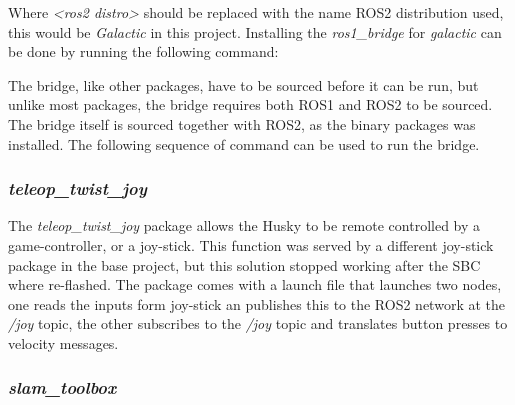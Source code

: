 \begin{tcolorbox}[width=\textwidth,colback={black},colupper=white, title={ubuntu terminal},colbacktitle=gray!125,coltitle=gray!50]\label{shell:echo1}    
\end{tcolorbox} 

Where \textit{<ros2 distro>} should be replaced with the name ROS2 distribution used, this would be \textit{Galactic} in this project. Installing the \textit{ros1\_bridge} for \textit{galactic} can be done by running the following command:

\begin{tcolorbox}[width=\textwidth,colback={black},colupper=white, title={ubuntu terminal},colbacktitle=gray!125,coltitle=gray!50]\label{shell:echo1}    
\end{tcolorbox} 

The bridge, like other packages, have to be sourced before it can be run, but unlike most packages, the bridge requires both ROS1 and ROS2 to be sourced. The bridge itself is sourced together with ROS2, as the binary packages was installed. The following sequence of command can be used to run the bridge.

\begin{tcolorbox}[width=\textwidth,colback={black},colupper=white, title={ubuntu terminal},colbacktitle=gray!125,coltitle=gray!50]\label{shell:echo1}    
\end{tcolorbox} 

\subsubsection{\textit{teleop\_twist\_joy}}
The \textit{teleop\_twist\_joy} package allows the Husky to be remote controlled by a game-controller, or a joy-stick. This function was served by a different joy-stick package in the base project, but this solution stopped working after the SBC where re-flashed. The package comes with a launch file that launches two nodes, one reads the inputs form joy-stick an publishes this to the ROS2 network at the \textit{/joy} topic, the other subscribes to the \textit{/joy} topic and translates button presses to velocity messages.

\subsubsection{\textit{slam\_toolbox}}
